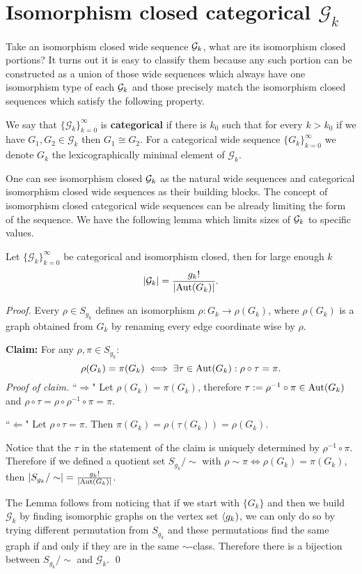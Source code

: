 \section{Isomorphism closed categorical \texorpdfstring{$\mathcal{G}_k$}{Gk}}

Take an isomorphism closed wide sequence $\mathcal{G}_k$, what are its isomorphism closed portions? It turns out it is easy to classify them because any such portion can be constructed as a union of those wide sequences which always have one isomorphism type of each $\mathcal{G}_k$ and those precisely match the isomorphism closed sequences which satisfy the following property.

\begin{defi}\label{lemmisocat}
We say that $\{\mathcal{G}_k\}_{k=0}^\infty$ is \textbf{categorical} if there is $k_0$ such that for every $k>k_0$ if we have $G_1,G_2\in\mathcal{G}_k$ then $G_1\cong G_2$. For a categorical wide sequence $\{G_k\}_{k=0}^\infty$ we denote $G_k$ the lexicographically minimal element of $\mathcal{G}_k$.
\end{defi}

One can see isomorphism closed $\mathcal{G}_k$ as the natural wide sequences and categorical isomorphism closed wide sequences as their building blocks. The concept of isomorphism closed categorical wide sequences can be already limiting the form of the sequence. We have the following lemma which limits sizes of $\mathcal{G}_k$ to specific values.

\begin{lemm}
Let $\{\mathcal{G}_k\}_{k=0}^\infty$ be categorical and isomorphism closed, then for large enough $k$
\[\left|{\mathcal{G}_k}\right|=\frac{g_k!}{\left|{\text{Aut}(G_k)}\right|}.\]
\end{lemm}
\begin{proof}
Every $\rho\in S_{g_k}$ defines an isomorphism $\rho:G_k\to\rho(G_k)$, where $\rho(G_k)$ is a graph obtained from $G_k$ by renaming every edge coordinate wise by $\rho$.

{}
\textbf{Claim:} For any $\rho,\pi\in S_{g_k}$:
\[\rho(G_k)=\pi(G_k)\iff\exists \tau\in\text{Aut}(G_k):\rho\circ\tau=\pi.\]
\textit{Proof of claim.} ``$\Rightarrow$" Let $\rho(G_k)=\pi(G_k)$, therefore $\tau:=\rho^{-1}\circ\pi\in\text{Aut}(G_k)$ and $\rho\circ\tau=\rho\circ\rho^{-1}\circ\pi=\pi.$

``$\Leftarrow$" Let $\rho\circ\tau=\pi$. Then $\pi(G_k)=\rho(\tau(G_k))=\rho(G_k).$ \qedhere

Notice that the $\tau$ in the statement of the claim is uniquely determined by $\rho^{-1}\circ\pi$. Therefore if we defined a quotient set $S_{g_k}/\sim$ with $\rho\sim\pi\iff\rho(G_k)=\pi(G_k)$, then $\left|{S_{g_k}/\sim}\right|=\frac{g_k!}{\left|{\text{Aut}(G_k)}\right|}$.

The Lemma follows from noticing that if we start with $\{G_k\}$ and then we build $\mathcal{G}_k$ by finding isomorphic graphs on the vertex set $\langle g_k)$, we can only do so by trying different permutation from $S_{g_k}$ and these permutations find the same graph if and only if they are in the same $\sim$-class. Therefore there is a bijection between $S_{g_k}/\sim$ and $\mathcal{G}_k$. \qed
\end{proof}

